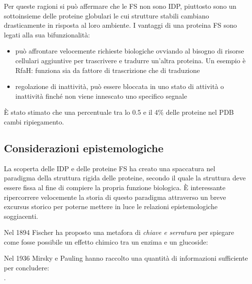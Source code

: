 {{Per queste ragioni si può affermare che le FS non sono IDP, piuttosto sono un sottoinsieme delle proteine globulari le cui strutture stabili cambiano drasticamente in risposta al loro ambiente. I vantaggi di una proteina FS sono legati alla sua bifunzionalità:
\begin{itemize}
	\item può affrontare velocemente richieste biologiche ovviando al bisogno di risorse cellulari aggiuntive per trascrivere e tradurre un'altra proteina. Un esempio è RfaH: funziona sia da fattore di trascrizione che di traduzione
	\item regolazione di inattività, può essere bloccata in uno stato di attività o inattività finché non viene innescato uno specifico segnale
\end{itemize}

È stato stimato che una percentuale tra lo 0.5 e il 4\% delle proteine nel PDB cambi ripiegamento\supercite{porter2018extant}.

}
\subsection{Considerazioni epistemologiche}
La scoperta delle IDP e delle proteine FS ha creato una spaccatura nel paradigma della struttura rigida delle proteine, secondo il quale la struttura deve essere fissa al fine di compiere la propria funzione biologica. È interessante ripercorrere velocemente la storia di questo paradigma attraverso un breve excursus storico per poterne mettere in luce le relazioni epistemologiche soggiacenti.

\par Nel 1894 Fischer ha proposto una metafora di \textit{chiave e serratura }per spiegare come fosse possibile un effetto chimico tra un enzima e un glucoside: \\

\par Nel 1936 Mirsky e Pauling hanno raccolto una quantità di informazioni sufficiente per concludere:\\
.

}

